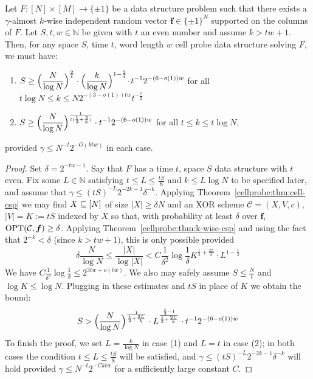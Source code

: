 \begin{theorem*} 
Let 
$F: [N] \times [M] \to \{\pm 1\}$ 
be a data structure problem such that there exists a  $\gamma$-almost $k$-wise independent random vector $\bm{f}\in \{\pm 1\}^N$ supported on the columns of $F$. Let $S,t,w \in \mathbb{N}$ be given with $t$ an even number and assume $k > tw + 1$. Then, for any space $S$, time $t$, word length $w$ cell probe data structure solving $F$, we must have:
\begin{enumerate}
    \item $\begin{aligned}[t]
    S \geq  \Bigl( \frac{N}{\log N}\Bigr)^{\frac{2}{t}} \cdot \Bigl(\frac{k}{\log N}\Bigl)^{1 - \frac{2}{t}}  \cdot\,t^{-1}2^{-(6-o(1))w }
  \end{aligned}$ for all $t\log N \leq k \leq N 2^{-(3-o(1))tw} t^{-\frac{t}{2}}$
  \item $\begin{aligned}[t]
    S \geq   \Bigl( \frac{N}{\log N}\Bigr)^{\frac{1}{t(\frac{1}{2} + \frac{2}{k})}} \cdot t^{-1}2^{-(6-o(1))w}
  \end{aligned}$ for all $t \leq k \leq t\log N$,
\end{enumerate}
 provided $\gamma \leq  N^{-t} 2^{-O(ktw)}$ in each case.
\end{theorem*}

\medskip 

\begin{proof}
Set $\delta = 2^{-tw-1}$.
Say that $F$ has a time $t$, space $S$ data structure with $t$ even. Fix some $L \in \mathbb{N}$ satisfying $t \leq L \leq \frac{tS}{8}$ and $k \leq L \log N$ to be specified later, and assume that $\gamma \leq (tS)^{-L} 2^{-2k-1} \delta^{-k}$. Applying Theorem~\ref{cellprobe:thm:cell-csp} we may find $X \subseteq [N]$ of size $|X| \geq \delta N$ and an XOR scheme $\mathcal{C}= (X,V,c)$, $|V|=K:=tS$ indexed by $X$ so that, with probability at least $\delta$ over $\bm{f}$, $\mathrm{OPT}(\mathcal{C},\bm{f}) \geq \delta$. Applying Theorem~\ref{cellprobe:thm:k-wise-csp} and using the fact that $2^{-k} < \delta$ (since $k > tw + 1)$, this is only possible provided
\[
\delta \frac{N}{\log N} \leq \frac{|X|}{\log |X|} <  C \frac{1}{\delta^2} \log \frac{1}{\delta} K^{\frac{t}{2} + \frac{2L}{k}} \cdot  L^{1 - \frac{t}{2}}
\]
We have $ C \frac{1}{\delta^3} \log \frac{1}{\delta}\leq 2^{3tw + o(tw)}$. We also may safely assume $S \leq \frac{N}{t}$ and $\log K \leq \log N$. Plugging in these estimates and $tS$ in place of $K$ we obtain the bound:
\begin{gather}
S > \Bigl(\frac{N}{\log N}\Bigr)^{\frac{1}{\frac{t}{2} + \frac{2L}{k}}} \cdot L^{\frac{\frac{t}{2}-1}{\frac{t}{2} + \frac{2L}{k}}} \cdot t^{-1}2^{-(6 - o(1))w}
\end{gather}
To finish the proof, we set $L = \frac{k}{\log N}$ in case (1) and $L = t$ in case (2); in both cases the condition $t \leq L \leq \frac{tS}{8}$ will be satisfied, and $\gamma \leq (tS)^{-L} 2^{-2k-1} \delta^{-k}$ will hold provided $\gamma \leq N^{-t} 2^{-C ktw}$ for a sufficiently large constant $C$.

\end{proof}
